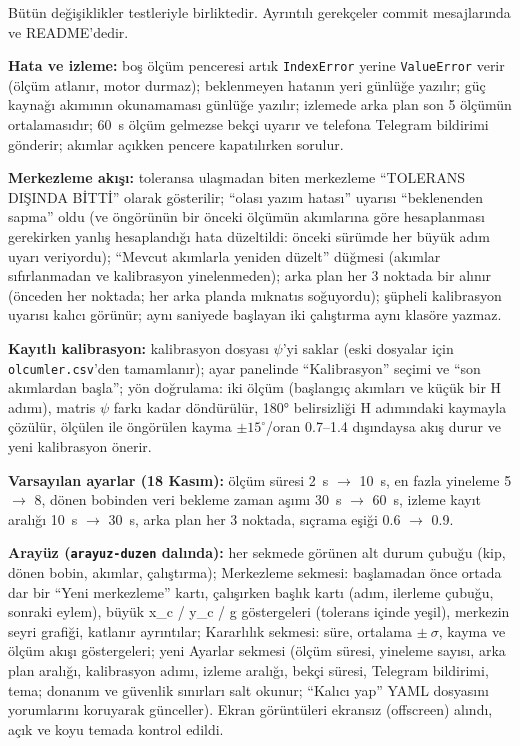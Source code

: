 \documentclass[11pt,a4paper]{article}
\newcommand{\kod}[1]{\texttt{#1}}
\begin{document}
Bütün değişiklikler testleriyle birliktedir. Ayrıntılı gerekçeler commit mesajlarında ve README'dedir.

\textbf{Hata ve izleme:} boş ölçüm penceresi artık \kod{IndexError} yerine \kod{ValueError} verir (ölçüm atlanır,
motor durmaz); beklenmeyen hatanın yeri günlüğe yazılır; güç kaynağı akımının okunamaması günlüğe yazılır;
izlemede arka plan son 5 ölçümün ortalamasıdır; 60~s ölçüm gelmezse bekçi uyarır ve telefona Telegram bildirimi
gönderir; akımlar açıkken pencere kapatılırken sorulur.

\textbf{Merkezleme akışı:} toleransa ulaşmadan biten merkezleme ``TOLERANS DIŞINDA BİTTİ'' olarak gösterilir;
``olası yazım hatası'' uyarısı ``beklenenden sapma'' oldu (ve öngörünün bir önceki ölçümün akımlarına göre
hesaplanması gerekirken yanlış hesaplandığı hata düzeltildi: önceki sürümde her büyük adım uyarı veriyordu);
``Mevcut akımlarla yeniden düzelt'' düğmesi (akımlar sıfırlanmadan ve kalibrasyon yinelenmeden); arka plan her 3
noktada bir alınır (önceden her noktada; her arka planda mıknatıs soğuyordu); şüpheli kalibrasyon uyarısı kalıcı
görünür; aynı saniyede başlayan iki çalıştırma aynı klasöre yazmaz.

\textbf{Kayıtlı kalibrasyon:} kalibrasyon dosyası $\psi$'yi saklar (eski dosyalar için \kod{olcumler.csv}'den
tamamlanır); ayar panelinde ``Kalibrasyon'' seçimi ve ``son akımlardan başla''; yön doğrulama: iki ölçüm
(başlangıç akımları ve küçük bir H adımı), matris $\psi$ farkı kadar döndürülür, 180° belirsizliği H adımındaki
kaymayla çözülür, ölçülen ile öngörülen kayma $\pm15^\circ$/oran 0.7--1.4 dışındaysa akış durur ve yeni kalibrasyon
önerir.

\textbf{Varsayılan ayarlar (18 Kasım):} ölçüm süresi 2~s $\to$ 10~s, en fazla yineleme 5 $\to$ 8, dönen bobinden veri
bekleme zaman aşımı 30~s $\to$ 60~s, izleme kayıt aralığı 10~s $\to$ 30~s, arka plan her 3 noktada, sıçrama eşiği
0.6 $\to$ 0.9.

\textbf{Arayüz (\kod{arayuz-duzen} dalında):} her sekmede görünen alt durum çubuğu (kip, dönen bobin, akımlar,
çalıştırma); Merkezleme sekmesi: başlamadan önce ortada dar bir ``Yeni merkezleme'' kartı, çalışırken başlık
kartı (adım, ilerleme çubuğu, sonraki eylem), büyük x\_c / y\_c / g göstergeleri (tolerans içinde yeşil), merkezin
seyri grafiği, katlanır ayrıntılar; Kararlılık sekmesi: süre, ortalama $\pm\ \sigma$, kayma ve ölçüm akışı
göstergeleri; yeni Ayarlar sekmesi (ölçüm süresi, yineleme sayısı, arka plan aralığı, kalibrasyon adımı, izleme
aralığı, bekçi süresi, Telegram bildirimi, tema; donanım ve güvenlik sınırları salt okunur; ``Kalıcı yap'' YAML
dosyasını yorumlarını koruyarak günceller). Ekran görüntüleri ekransız (offscreen) alındı, açık ve koyu temada
kontrol edildi.
\end{document}

